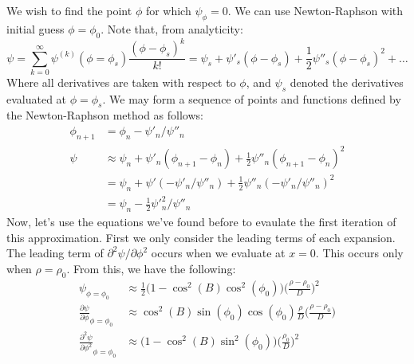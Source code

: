\documentclass[crop=false,class=book,oneside]{standalone}
\begin{document}
            We wish to find the point $\phi$ for which
            $\psi_{\phi}=0$. We can use Newton-Raphson
            with initial guess
            $\phi=\phi_{0}$. Note that, from analyticity:
            \begin{equation*}
                \psi=\sum_{k=0}^{\infty}
                     \psi^{(k)}(\phi=\phi_{s})
                     \frac{(\phi-\phi_{s})^{k}}{k!}
                    =\psi_{s}+\psi'_{s}(\phi-\phi_{s})
                    +\frac{1}{2}\psi''_{s}(\phi-\phi_{s})^{2}
                    +\hdots
            \end{equation*}
            Where all derivatives are taken with respect to
            $\phi$, and $\psi_{s}$ denoted the derivatives
            evaluated at $\phi=\phi_{s}$.
            We may form a sequence of points and
            functions defined by
            the Newton-Raphson method as follows:
            \begin{align*}
                \phi_{n+1}&=\phi_{n}-\psi'_{n}/\psi''_{n}\\
                \psi&\approx
                \psi_{n}+\psi'_{n}(\phi_{n+1}-\phi_{n})
                +\frac{1}{2}\psi''_{n}(\phi_{n+1}-\phi_{n})^{2}\\
                &=\psi_{n}+\psi'(-\psi'_{n}/\psi''_{n})
                 +\frac{1}{2}
                  \psi''_{n}(-\psi'_{n}/\psi''_{n})^{2}\\
                &=\psi_{n}-\frac{1}{2}\psi'^{2}_{n}/\psi''_{n}
            \end{align*}
            Now, let's use the equations we've found before
            to evaulate the first iteration of this
            approximation. First we only consider the
            leading terms of each expansion. The leading term
            of $\partial^{2}\psi/\partial\phi^{2}$ occurs
            when we evaluate at $x=0$. This occurs only
            when $\rho=\rho_{0}$. From this, we have the
            following:
            \begin{align*}
                \psi_{\phi=\phi_{0}}
                &\approx
                    \frac{1}{2}\big(
                        1-\cos^{2}(B)\cos^{2}(\phi_{0})
                    \big)
                    \Big(\frac{\rho-\rho_{0}}{D}\Big)^{2}\\
                \frac{\partial\psi}
                     {\partial\phi}_{\phi=\phi_{0}}
                &\approx
                    \cos^{2}(B)\sin(\phi_{0})\cos(\phi_{0})
                    \frac{\rho}{D}
                    \Big(\frac{\rho-\rho_{0}}{D}\Big)\\
                \frac{\partial^{2}\psi}
                     {\partial\phi^{2}}_{\phi=\phi_{0}}
                &\approx
                    \big(1-\cos^{2}(B)\sin^{2}(\phi_{0})\big)
                    \Big(\frac{\rho_{0}}{D}\Big)^{2}
            \end{align*}
\end{document}
